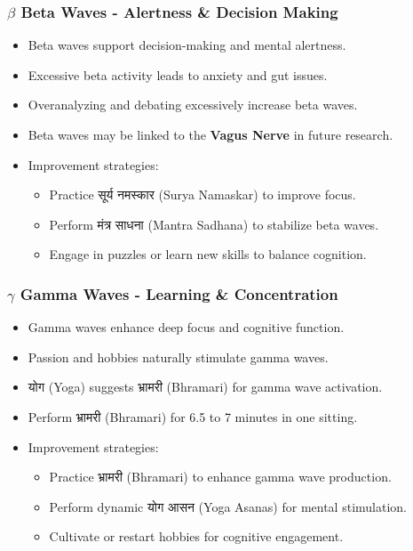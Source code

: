 \begin{frame}[fragile]\frametitle{$\beta$ Beta Waves - Alertness \& Decision Making}
      \begin{itemize}
          \item Beta waves support decision-making and mental alertness.
          \item Excessive beta activity leads to anxiety and gut issues.
          \item Overanalyzing and debating excessively increase beta waves.
          \item Beta waves may be linked to the \textbf{Vagus Nerve} in future research.
          \item Improvement strategies:
            \begin{itemize}
                \item Practice सूर्य नमस्कार (Surya Namaskar) to improve focus.
                \item Perform मंत्र साधना (Mantra Sadhana) to stabilize beta waves.
                \item Engage in puzzles or learn new skills to balance cognition.
            \end{itemize}
      \end{itemize}
\end{frame}

\begin{frame}[fragile]\frametitle{$\gamma$ Gamma Waves - Learning \& Concentration}
      \begin{itemize}
          \item Gamma waves enhance deep focus and cognitive function.
          \item Passion and hobbies naturally stimulate gamma waves.
          \item योग (Yoga) suggests भ्रामरी (Bhramari) for gamma wave activation.
          \item Perform भ्रामरी (Bhramari) for 6.5 to 7 minutes in one sitting.
          \item Improvement strategies:
            \begin{itemize}
                \item Practice भ्रामरी (Bhramari) to enhance gamma wave production.
                \item Perform dynamic योग आसन (Yoga Asanas) for mental stimulation.
                \item Cultivate or restart hobbies for cognitive engagement.
            \end{itemize}
      \end{itemize}
\end{frame}

